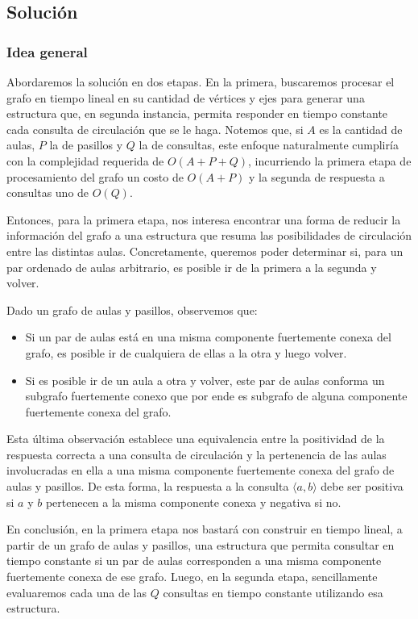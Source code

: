 \subsection{Solución}

\subsubsection{Idea general}

Abordaremos la solución en dos etapas. En la primera, buscaremos procesar el grafo en tiempo lineal en su cantidad de vértices y ejes para generar una estructura que, en segunda instancia, permita responder en tiempo constante cada consulta de circulación que se le haga. Notemos que, si $A$ es la cantidad de aulas, $P$ la de pasillos y $Q$ la de consultas, este enfoque naturalmente cumpliría con la complejidad requerida de $O(A+P+Q)$, incurriendo la primera etapa de procesamiento del grafo un costo de $O(A+P)$ y la segunda de respuesta a consultas uno de $O(Q)$.

Entonces, para la primera etapa, nos interesa encontrar una forma de reducir la información del grafo a una estructura que resuma las posibilidades de circulación entre las distintas aulas. Concretamente, queremos poder determinar si, para un par ordenado de aulas arbitrario, es posible ir de la primera a la segunda y volver.

Dado un grafo de aulas y pasillos, observemos que:
\begin{itemize}
    \item Si un par de aulas está en una misma componente fuertemente conexa del grafo, es posible ir de cualquiera de ellas a la otra y luego volver.
    \item Si es posible ir de un aula a otra y volver, este par de aulas conforma un subgrafo fuertemente conexo que por ende es subgrafo de alguna componente fuertemente conexa del grafo.
\end{itemize}

Esta última observación establece una equivalencia entre la positividad de la respuesta correcta a una consulta de circulación y la pertenencia de las aulas involucradas en ella a una misma componente fuertemente conexa del grafo de aulas y pasillos. De esta forma, la respuesta a la consulta $\langle a,b \rangle$ debe ser positiva si $a$ y $b$ pertenecen a la misma componente conexa y negativa si no.

En conclusión, en la primera etapa nos bastará con construir en tiempo lineal, a partir de un grafo de aulas y pasillos, una estructura que permita consultar en tiempo constante si un par de aulas corresponden a una misma componente fuertemente conexa de ese grafo. Luego, en la segunda etapa, sencillamente evaluaremos cada una de las $Q$ consultas en tiempo constante utilizando esa estructura.

